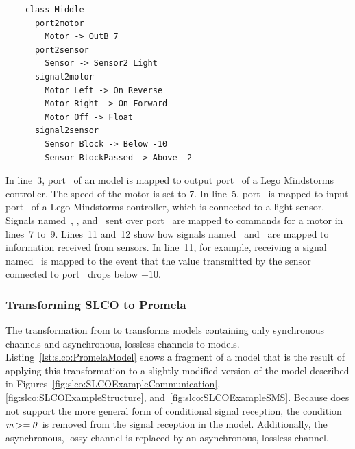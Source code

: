 \begin{listing}
  \lstset{
    language=slco2nqc,
    label=lst:slco:SLCO2NQCMapping,
    caption=Part of a mapping from \SLCO to \NQC,
    numbers=left
  }
  \begin{lstlisting}
    class Middle
      port2motor
        Motor -> OutB 7
      port2sensor
        Sensor -> Sensor2 Light
      signal2motor
        Motor Left -> On Reverse
        Motor Right -> On Forward
        Motor Off -> Float
      signal2sensor
        Sensor Block -> Below -10
        Sensor BlockPassed -> Above -2
  \end{lstlisting}
\end{listing}

In line~3, port~ of an \SLCO model is mapped to output port~ of a Lego Mindstorms controller.
The speed of the motor is set to 7.
In line~5, \SLCO port~ is mapped to input port~ of a Lego Mindstorms controller, which is connected to a light sensor.
Signals named~, , and~ sent over port~ are mapped to commands for a motor in lines~7 to~9.
Lines~11 and~12 show how signals named~ and~ are mapped to information received from sensors.
In line~11, for example, receiving a signal named~ is mapped to the event that the value transmitted by the sensor connected to port~ drops below $-10$.

\subsubsection{Transforming SLCO to Promela}
\label{subsubsec:slco:transformation-to-promela}

The transformation from \SLCO to \Promela transforms \SLCO models containing only synchronous channels and asynchronous, lossless channels to \Promela models.
Listing~\ref{lst:slco:PromelaModel} shows a fragment of a \Promela model that is the result of applying this transformation to a slightly modified version of the \SLCO model described in Figures~\ref{fig:slco:SLCOExampleCommunication}, \ref{fig:slco:SLCOExampleStructure}, and~\ref{fig:slco:SLCOExampleSMS}.
Because \Promela does not support the more general form of conditional signal reception, the condition~$\it{m} \operatorname*{>=} 0$ is removed from the signal reception in the \SLCO model.
Additionally, the asynchronous, lossy channel is replaced by an asynchronous, lossless channel.

